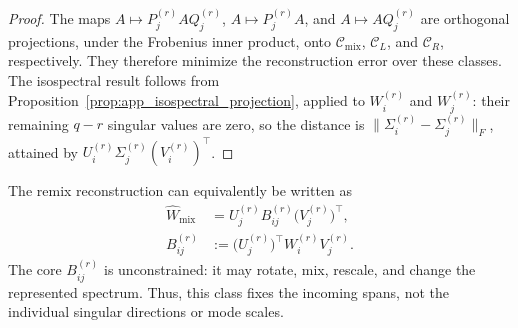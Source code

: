 \documentclass[11pt, a4paper]{utda}
\theoremstyle{plain}
\theoremstyle{definition}
\theoremstyle{remark}
\begin{document}
\begin{proof}
The maps $A\mapsto P_j^{(r)}AQ_j^{(r)}$,
$A\mapsto P_j^{(r)}A$, and $A\mapsto AQ_j^{(r)}$
are orthogonal projections, under the Frobenius inner product,
onto $\mathcal C_{\mathrm{mix}}$, $\mathcal C_L$, and
$\mathcal C_R$, respectively.
They therefore minimize the reconstruction error over these classes.
The isospectral result follows from
Proposition~\ref{prop:app_isospectral_projection}, applied to
$W_i^{(r)}$ and $W_j^{(r)}$: their remaining $q-r$ singular
values are zero, so the distance is
$\|\Sigma_i^{(r)}-\Sigma_j^{(r)}\|_F$, attained by
$U_i^{(r)}\Sigma_j^{(r)}(V_i^{(r)})^\top$.
\end{proof}

The remix reconstruction can equivalently be written as
\begin{equation}
\label{eq:app_incoming_subspace_remix}
\begin{aligned}
    \widehat W_{\mathrm{mix}}
    &= U_j^{(r)}B_{ij}^{(r)}\bigl(V_j^{(r)}\bigr)^\top,\\
    B_{ij}^{(r)}
    &:= \bigl(U_j^{(r)}\bigr)^\top W_i^{(r)}V_j^{(r)}.
\end{aligned}
\end{equation}
The core $B_{ij}^{(r)}$ is unconstrained: it may rotate, mix,
rescale, and change the represented spectrum.
Thus, this class fixes the incoming spans, not the individual
singular directions or mode scales.
\end{document}
